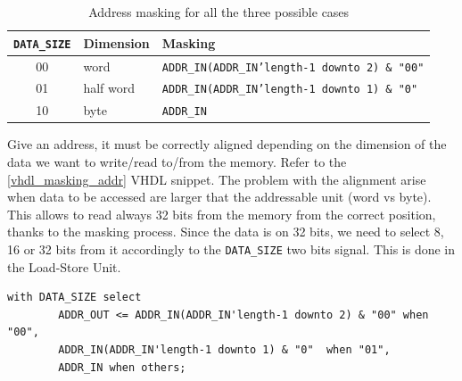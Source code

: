 \begin{table}[ht]
	\begin{center}
		\begin{tabular}{ c| l | l}
			\texttt{DATA\_SIZE} & \textbf{Dimension} & \textbf{Masking}\\
			\hline
			00 & word & \texttt{ADDR\_IN(ADDR\_IN'length-1 downto 2) \& "00"}\\
			01 & half word & \texttt{ADDR\_IN(ADDR\_IN'length-1 downto 1) \& "0"} \\
			10 & byte & \texttt{ADDR\_IN}
			
		\end{tabular}
		\caption{Address masking for all the three possible cases}
		\label{tab:addr_masking}
	\end{center}
\end{table}


Give an address, it must be correctly aligned depending on the dimension of the data we want to write/read to/from the memory. Refer to the \ref{vhdl_masking_addr} VHDL snippet. The problem with the alignment arise when data to be accessed are larger that the addressable unit (word vs byte). This allows to read always 32 bits from the memory from the correct position, thanks to the masking process. Since the data is on 32 bits, we need to select 8, 16 or 32 bits from it accordingly to the \texttt{DATA\_SIZE} two bits signal. This is done in the Load-Store Unit.

\hfill
\begin{lstlisting}[style=vhdl,caption={VHDL code for address alignment},label=vhdl_masking_addr]
	with DATA_SIZE select
		ADDR_OUT <= ADDR_IN(ADDR_IN'length-1 downto 2) & "00" when "00",
		ADDR_IN(ADDR_IN'length-1 downto 1) & "0"  when "01",
		ADDR_IN when others;
\end{lstlisting}

